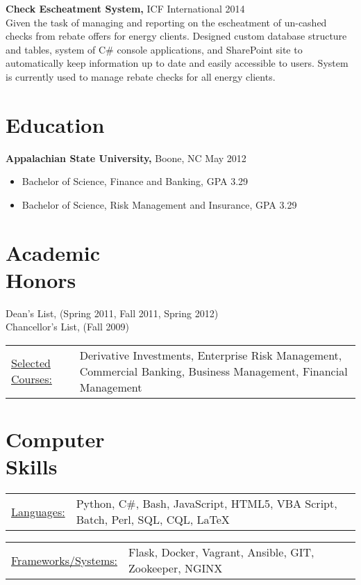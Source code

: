 \documentclass{res}
\begin{document}
\begin{resume}
  {\bf Check Escheatment System,} ICF International \hfill 2014 \\
    Given the task of managing and reporting on the escheatment of un-cashed checks from rebate offers for energy clients. Designed custom database structure and tables, system of C\# console applications, and SharePoint site to automatically keep information up to date and easily accessible to users. System is currently used to manage rebate checks for all energy clients.

\section{Education} 
  {\bf Appalachian State University,} Boone, NC \hfill May 2012
    \begin{itemize} \itemsep -2pt
      \item Bachelor of Science, Finance and Banking, GPA 3.29
      \item Bachelor of Science, Risk Management and Insurance, GPA 3.29
    \end{itemize}

\section{Academic \\ Honors} 
  Dean's List, (Spring 2011, Fall 2011, Spring 2012) \\
  Chancellor's List, (Fall 2009) \\
  \begin{tabular}{l p{4.5in}}
    \underline{Selected Courses:} & \raggedright Derivative Investments, Enterprise Risk Management, Commercial Banking, Business Management, Financial Management \\
  \end{tabular}

\section{Computer \\ Skills}
   \begin{tabular}{l p{5in}}
    \underline{Languages:} & \raggedright Python, C\#, Bash, JavaScript, HTML5, VBA Script, Batch, Perl, SQL, CQL, \LaTeX\\
   \end{tabular}
   \begin{tabular}{l p{5in}}
    \underline{Frameworks/Systems:} & \raggedright Flask, Docker, Vagrant, Ansible, GIT, Zookeeper, NGINX
 \end{tabular}
\end{resume} 
\end{document}
